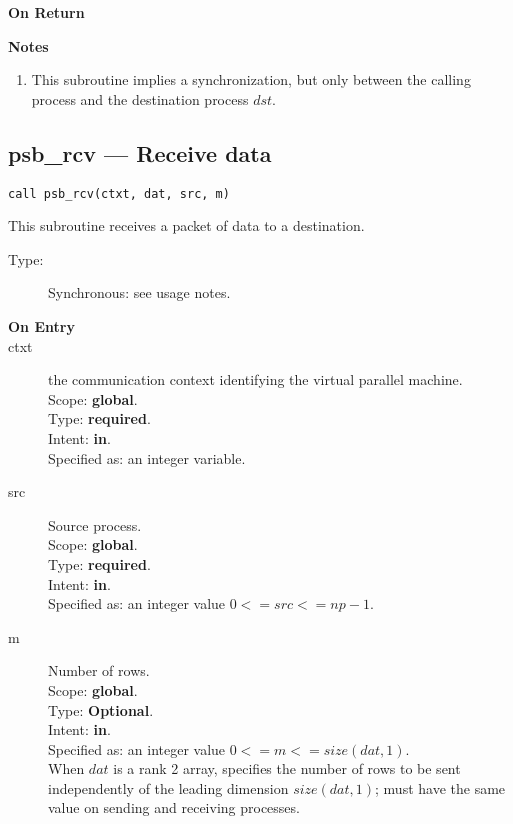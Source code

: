\begin{description}
\item[\bf On Return]
\end{description}

{\par\noindent\large\bfseries Notes}
\begin{enumerate}
\item This subroutine implies a synchronization, but only between the
  calling process and the destination  process $dst$.
\end{enumerate}


\clearpage\subsection{psb\_rcv --- Receive data}

\begin{verbatim}
call psb_rcv(ctxt, dat, src, m)
\end{verbatim}

This subroutine receives a packet of data to a destination.
\begin{description}
\item[Type:] Synchronous: see usage notes.
\item[\bf  On Entry ]
\item[ctxt] the communication context identifying the virtual
  parallel machine.\\
Scope: {\bf global}.\\
Type: {\bf required}.\\
Intent: {\bf in}.\\
Specified as: an integer variable.
\item[src] Source process.\\
Scope: {\bf global}.\\
Type: {\bf required}.\\
Intent: {\bf in}.\\
Specified as: an integer value $0<= src <= np-1$. \\
\item[m] Number of rows.\\
Scope: {\bf global}.\\
Type: {\bf Optional}.\\
Intent: {\bf in}.\\
Specified as: an integer value $0<= m <= size(dat,1)$. \\
When $dat$ is a rank 2 array, specifies the number of rows to be sent
independently of the leading dimension $size(dat,1)$; must have the
same value on sending and receiving processes.
\end{description}


